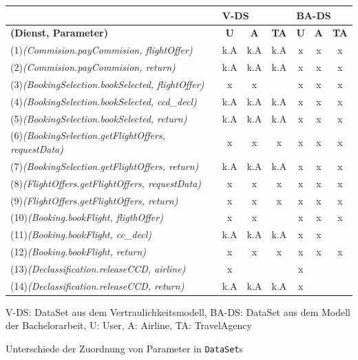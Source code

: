 \begin{threeparttable}
\centering
\begin{tabular}{l|c|c|c|c|c|c}
\textbf{} & \multicolumn{3}{l}{\textbf{V-DS}} & \multicolumn{3}{|l}{\textbf{BA-DS}}\\\hline
\textbf{(Dienst, Parameter)} & \textbf{U} & \textbf{A} & \textbf{TA} & \textbf{U} & \textbf{A} & \textbf{TA} \\\hline
(1)\textit{(Commision.payCommision, flightOffer)} & k.A & k.A & k.A & x & x & x\\\hline
(2)\textit{(Commision.payCommision, return)} & k.A & k.A & k.A & x & x & x\\\hline
(3)\textit{(BookingSelection.bookSelected, flightOffer)} & x & x & & x & x & x\\\hline
(4)\textit{(BookingSelection.bookSelected, ccd\_decl)} & k.A & k.A & k.A & x & x & x\\\hline
(5)\textit{(BookingSelection.bookSelected, return)} & k.A & k.A & k.A & x & x & x\\\hline
(6)\textit{(BookingSelection.getFlightOffers, requestData)} & x & x & x & x & x & x\\\hline
(7)\textit{(BookingSelection.getFlightOffers, return)} & k.A & k.A & k.A & x & x & x\\\hline
(8)\textit{(FlightOffers.getFlightOffers, requestData)} & x & x & x & x & x & x\\\hline
(9)\textit{(FlightOffers.getFlightOffers, return)} & x & x & x & x & x & x\\\hline
(10)\textit{(Booking.bookFlight, fligthOffer)} & x & x & & x & x & x\\\hline
(11)\textit{(Booking.bookFlight, cc\_decl)} & k.A & k.A & k.A & x & x & \\\hline
(12)\textit{(Booking.bookFlight, return)} & x & x & x & x & x & x\\\hline
(13)\textit{(Declassification.releaseCCD, airline)} & x & & & x & & \\\hline
(14)\textit{(Declassification.releaseCCD, return)} & k.A & k.A & k.A & x & & \\\hline
\end{tabular}
\begin{tablenotes}
      \small
      \item V-DS: DataSet aus dem Vertraulichkeitsmodell, BA-DS: DataSet aus dem Modell der Bachelorarbeit, U: User, A: Airline, TA: TravelAgency
    \end{tablenotes}
\caption{\label{tab:data:unterschiede} Unterschiede der Zuordnung von Parameter in \texttt{DataSet}s}
\end{threeparttable}

